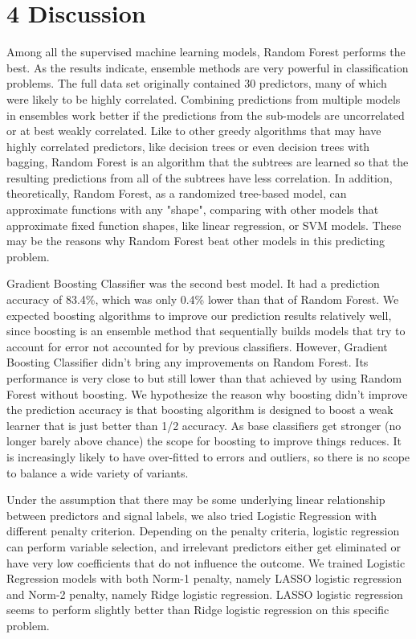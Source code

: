 \documentclass[11pt]{article}
\begin{document}
\section*{4 Discussion}
Among all the supervised machine learning models, Random Forest performs the best. As the results indicate, ensemble methods are very powerful in classification problems. The full data set originally contained 30 predictors, many of which were likely to be highly correlated. Combining predictions from multiple models in ensembles work better if the predictions from the sub-models are uncorrelated or at best weakly correlated. 
Like to other greedy algorithms that may have highly correlated predictors, like decision trees or even decision trees with bagging, Random Forest is an algorithm that the subtrees are learned so that the resulting predictions from all of the subtrees have less correlation. In addition, theoretically, Random Forest, as a randomized tree-based model, can approximate functions with any "shape", comparing with other models that approximate fixed function shapes, like linear regression, or SVM models. These may be the reasons why Random Forest beat other models in this predicting problem.

Gradient Boosting Classifier was the second best model. It had a prediction accuracy of 83.4\%, which was only 0.4\% lower than that of Random Forest. We expected boosting algorithms to improve our prediction results relatively well, since boosting is an ensemble method that sequentially builds models that try to account for error not accounted for by previous classifiers. However, Gradient Boosting Classifier didn't bring any improvements on Random Forest. Its performance is very close to but still lower than that achieved by using Random Forest without boosting. We hypothesize the reason why boosting didn't improve the prediction accuracy is that boosting algorithm is designed to boost a weak learner that is just better than 1/2 accuracy. As base classifiers get stronger (no longer barely above chance) the scope for boosting to improve things reduces. It is increasingly likely to have over-fitted to errors and outliers, so there is no scope to balance a wide variety of variants.

Under the assumption that there may be some underlying linear relationship between predictors and signal labels, we also tried Logistic Regression with different penalty criterion. Depending on the penalty criteria, logistic regression can perform variable selection, and irrelevant predictors either get eliminated or have very low coefficients that do not influence the outcome. We trained Logistic Regression models with both Norm-1 penalty, namely LASSO logistic regression and Norm-2 penalty, namely Ridge logistic regression. LASSO logistic regression seems to perform slightly better than Ridge logistic regression on this specific problem.
\end{document}
